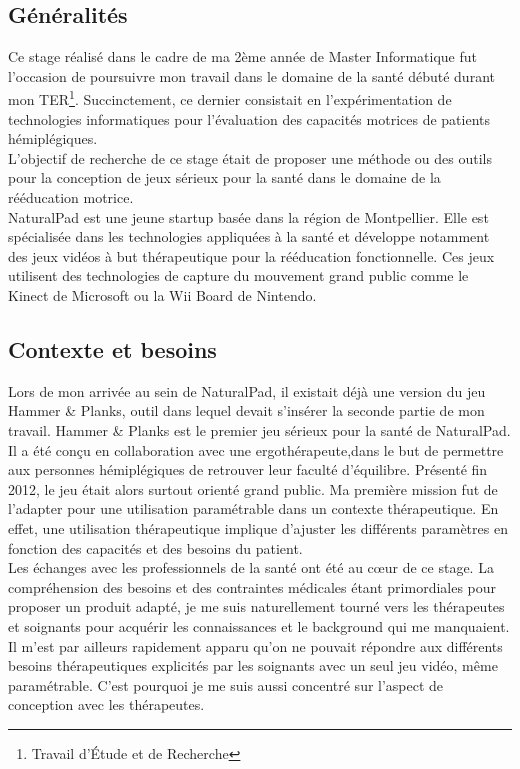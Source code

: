 \documentclass[french, 12pt]{article} %
\begin{document}
	\subsection{Généralités}
Ce stage réalisé dans le cadre de ma 2ème année de Master Informatique fut l'occasion de poursuivre mon travail dans le domaine de la santé débuté durant mon TER\footnote{Travail d'Étude et de Recherche}. Succinctement, ce dernier consistait en l'expérimentation de technologies informatiques pour l'évaluation des capacités motrices de patients hémiplégiques. \\
L'objectif de recherche de ce stage était de proposer une méthode ou des outils pour la conception de jeux sérieux pour la santé dans le domaine de la rééducation motrice. \\
NaturalPad est une jeune startup basée dans la région de Montpellier. Elle est spécialisée dans les technologies appliquées à la santé et développe notamment des jeux vidéos à but thérapeutique pour la rééducation fonctionnelle. Ces jeux utilisent des technologies de capture du mouvement grand public comme le Kinect de Microsoft ou la Wii Board de Nintendo. \\

\subsection{Contexte et besoins}
Lors de mon arrivée au sein de NaturalPad, il existait déjà une version du jeu Hammer \& Planks, outil dans lequel devait s'insérer la seconde partie de mon travail. Hammer \& Planks est le premier jeu sérieux pour la santé de NaturalPad. Il a été conçu en collaboration avec une ergothérapeute,dans le but de permettre aux personnes hémiplégiques de retrouver leur faculté d'équilibre. Présenté fin 2012, le jeu était alors surtout orienté grand public. Ma première mission fut de l'adapter pour une utilisation paramétrable dans un contexte thérapeutique. En effet, une utilisation thérapeutique implique d'ajuster les différents paramètres en fonction des capacités et des besoins du patient.\\
Les échanges avec les professionnels de la santé ont été au cœur de ce stage. La compréhension des besoins et des contraintes médicales étant primordiales pour proposer un produit adapté, je me suis naturellement tourné vers les thérapeutes et soignants pour acquérir les connaissances et le background qui me manquaient. Il m'est par ailleurs rapidement apparu qu'on ne pouvait répondre aux différents besoins thérapeutiques explicités par les soignants avec un seul jeu vidéo, même paramétrable. C'est pourquoi je me suis aussi concentré sur l'aspect de conception avec les thérapeutes. 
\end{document}
